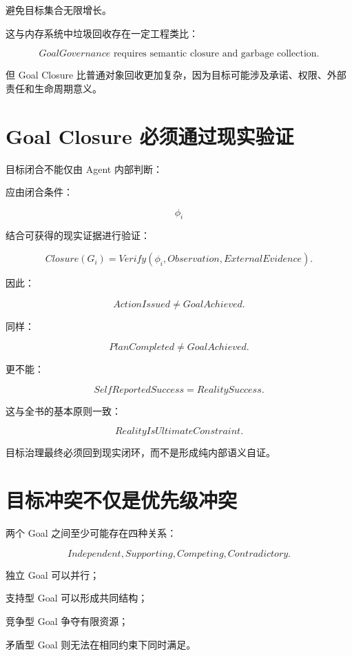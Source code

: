 避免目标集合无限增长。

这与内存系统中垃圾回收存在一定工程类比：

\[
\boxed{
GoalGovernance
\text{ requires semantic closure and garbage collection.}
}
\]

但 Goal Closure 比普通对象回收更加复杂，因为目标可能涉及承诺、权限、外部责任和生命周期意义。


\section{Goal Closure 必须通过现实验证}

目标闭合不能仅由 Agent 内部判断：

\begin{statementbox}
\centering
{}
\end{statementbox}

应由闭合条件：

\[
\phi_i
\]

结合可获得的现实证据进行验证：

\[
\boxed{
Closure(G_i)
=
Verify(
\phi_i,
Observation,
ExternalEvidence
).
}
\]

因此：

\[
ActionIssued
\neq
GoalAchieved.
\]

同样：

\[
PlanCompleted
\neq
GoalAchieved.
\]

更不能：

\[
SelfReportedSuccess
=
RealitySuccess.
\]

这与全书的基本原则一致：

\[
\boxed{
RealityIsUltimateConstraint.
}
\]

目标治理最终必须回到现实闭环，而不是形成纯内部语义自证。


\section{目标冲突不仅是优先级冲突}

两个 Goal 之间至少可能存在四种关系：

\[
\boxed{
Independent,
Supporting,
Competing,
Contradictory.
}
\]

独立 Goal 可以并行；

支持型 Goal 可以形成共同结构；

竞争型 Goal 争夺有限资源；

矛盾型 Goal 则无法在相同约束下同时满足。

